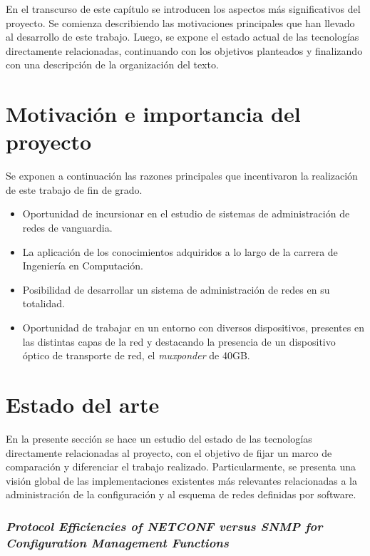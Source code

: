 En el transcurso de este capítulo se introducen los aspectos más significativos del proyecto. Se comienza describiendo las motivaciones principales que han llevado al desarrollo de este trabajo. Luego, se expone el estado actual de las tecnologías directamente relacionadas, continuando con los objetivos planteados y finalizando con una descripción de la organización del texto.

\section{Motivación e importancia del proyecto}

Se exponen a continuación las razones principales que incentivaron la realización de este trabajo de fin de grado.

\begin{itemize}     
    \item Oportunidad de incursionar en el estudio de sistemas de administración de redes de vanguardia.
    \item La aplicación de los conocimientos adquiridos a lo largo de la carrera de Ingeniería en Computación.
    \item Posibilidad de desarrollar un sistema de administración de redes en su totalidad.
    \item Oportunidad de trabajar en un entorno con diversos dispositivos, presentes en las distintas capas de la red y destacando la presencia de un dispositivo óptico de transporte de red, el \textit{muxponder} de 40GB.
\end{itemize}
    
\section{Estado del arte} \label{Estado_Arte} %

En la presente sección se hace un estudio del estado de las tecnologías directamente relacionadas al proyecto, con el objetivo de fijar un marco de comparación y diferenciar el trabajo realizado. Particularmente, se presenta una visión global de las implementaciones existentes más relevantes relacionadas a la administración de la configuración y al esquema de redes definidas por software.



\subsubsection*{\textit{Protocol Efficiencies of NETCONF versus SNMP for Configuration Management Functions}}

